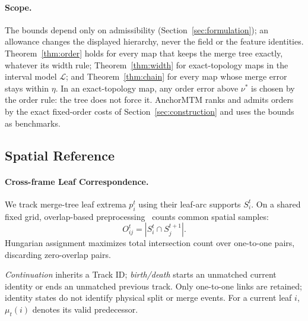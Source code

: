 \documentclass[review]{vgtc}
\begin{document}
\paragraph{Scope.} The bounds depend only on admissibility (Section~\ref{sec:formulation}); an allowance changes the displayed hierarchy, never the field or the feature identities. Theorem~\ref{thm:order} holds for every map that keeps the merge tree exactly, whatever its width rule; Theorem~\ref{thm:width} for exact-topology maps in the interval model $\mathcal{L}$; and Theorem~\ref{thm:chain} for every map whose merge error stays within $\eta$. In an exact-topology map, any order error above $\nu^*$ is chosen by the order rule: the tree does not force it. AnchorMTM ranks and admits orders by the exact fixed-order costs of Section~\ref{sec:construction} and uses the bounds as benchmarks.


\subsection{Spatial Reference}\label{sec:reference}
\paragraph{Cross-frame Leaf Correspondence.}
We track merge-tree leaf extrema $p_i^t$ using their leaf-arc supports $S_i^t$. On a shared fixed grid, overlap-based preprocessing~\cite{STMTM:2026} counts common spatial samples:
\begin{equation}\label{eq:overlap}
 O_{ij}^t=|S_i^t\cap S_j^{t+1}|.
\end{equation}
Hungarian assignment maximizes total intersection count over one-to-one pairs, discarding zero-overlap pairs.

\emph{Continuation} inherits a Track ID; \emph{birth/death} starts an unmatched current identity or ends an unmatched previous track. Only one-to-one links are retained; identity states do not identify physical split or merge events. For a current leaf $i$, $\mu_t(i)$ denotes its valid predecessor.
\end{document}
